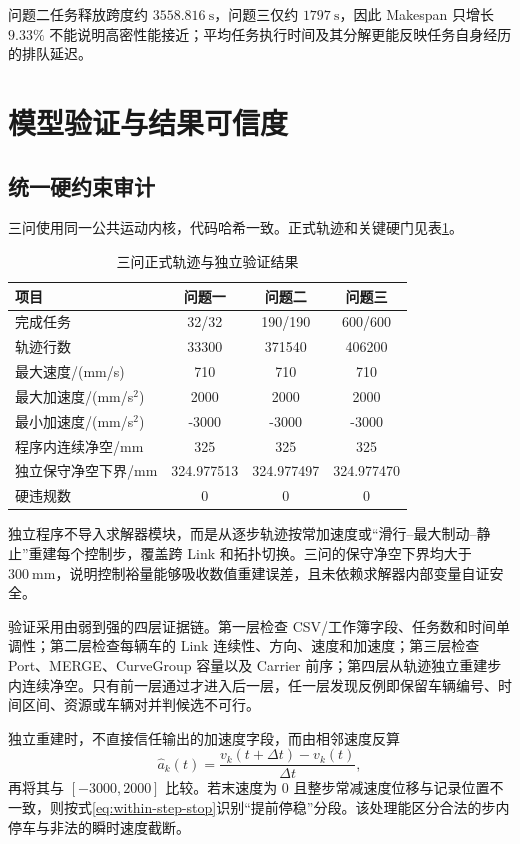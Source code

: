 \documentclass[UTF8]{ctexart}
\begin{document}
问题二任务释放跨度约 $3558.816\ \mathrm{s}$，问题三仅约 $1797\ \mathrm{s}$，因此 Makespan 只增长 $9.33\%$ 不能说明高密性能接近；平均任务执行时间及其分解更能反映任务自身经历的排队延迟。

\section{模型验证与结果可信度}
\subsection{统一硬约束审计}

三问使用同一公共运动内核，代码哈希一致。正式轨迹和关键硬门见表\ref{tab:validation}。
\begin{table}[H]
\centering
\caption{三问正式轨迹与独立验证结果}
\renewcommand{\arraystretch}{1.35}
\begin{tabular*}{\textwidth}{@{\extracolsep{\fill}}lccc@{}}
\toprule[1pt]
项目 & 问题一 & 问题二 & 问题三\\ \midrule
完成任务 & 32/32 & 190/190 & 600/600\\
轨迹行数 & 33300 & 371540 & 406200\\
最大速度/(mm/s) & 710 & 710 & 710\\
最大加速度/(mm/s$^2$) & 2000 & 2000 & 2000\\
最小加速度/(mm/s$^2$) & -3000 & -3000 & -3000\\
程序内连续净空/mm & 325 & 325 & 325\\
独立保守净空下界/mm & 324.977513 & 324.977497 & 324.977470\\
硬违规数 & 0 & 0 & 0\\
\bottomrule[1pt]
\end{tabular*}
\label{tab:validation}
\end{table}

独立程序不导入求解器模块，而是从逐步轨迹按常加速度或“滑行--最大制动--静止”重建每个控制步，覆盖跨 Link 和拓扑切换。三问的保守净空下界均大于 $300\ \mathrm{mm}$，说明控制裕量能够吸收数值重建误差，且未依赖求解器内部变量自证安全。

验证采用由弱到强的四层证据链。第一层检查 CSV/工作簿字段、任务数和时间单调性；第二层检查每辆车的 Link 连续性、方向、速度和加速度；第三层检查 Port、MERGE、CurveGroup 容量以及 Carrier 前序；第四层从轨迹独立重建步内连续净空。只有前一层通过才进入后一层，任一层发现反例即保留车辆编号、时间区间、资源或车辆对并判候选不可行。

独立重建时，不直接信任输出的加速度字段，而由相邻速度反算
\begin{equation}
\hat a_k(t)=\frac{v_k(t+\Delta t)-v_k(t)}{\Delta t},
\end{equation}
再将其与 $[-3000,2000]$ 比较。若末速度为 0 且整步常减速度位移与记录位置不一致，则按式\eqref{eq:within-step-stop}识别“提前停稳”分段。该处理能区分合法的步内停车与非法的瞬时速度截断。
\end{document}
